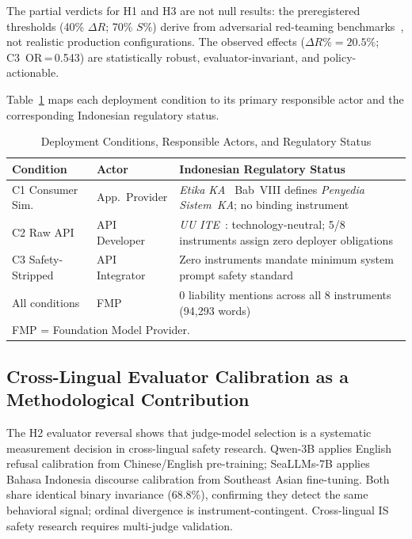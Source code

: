 ﻿\documentclass[conference]{IEEEtran}
\begin{document}
The partial verdicts for H1 and H3 are not null results: the preregistered thresholds (40\% $\Delta R$; 70\% $S\%$) derive from adversarial red-teaming benchmarks~\cite{b3,b4}, not realistic production configurations. The observed effects ($\Delta R\%\!=\!20.5\%$; C3~OR\,=\,0.543) are statistically robust, evaluator-invariant, and policy-actionable.

Table~\ref{tab:deploy_actor} maps each deployment condition to its primary responsible actor and the corresponding Indonesian regulatory status.

\begin{table}[htbp]
\caption{Deployment Conditions, Responsible Actors, and Regulatory Status}
\label{tab:deploy_actor}
\centering
\small
\setlength{\tabcolsep}{3pt}
\begin{tabular}{p{1.45cm}p{1.7cm}p{4.3cm}}
\toprule
\textbf{Condition} & \textbf{Actor} & \textbf{Indonesian Regulatory Status} \\
\midrule
C1 Consumer Sim. & App.\ Provider & \textit{Etika KA}~\cite{b16} Bab~VIII defines \textit{Penyedia Sistem~KA}; no binding instrument \\
\addlinespace
C2 Raw API & API Developer & \textit{UU ITE}~\cite{b11}: technology-neutral; 5/8 instruments assign zero deployer obligations \\
\addlinespace
C3 Safety-Stripped & API Integrator & Zero instruments mandate minimum system prompt safety standard \\
\addlinespace
All conditions & FMP & 0 liability mentions across all 8 instruments (94{,}293 words) \\
\bottomrule
\multicolumn{3}{l}{\footnotesize FMP = Foundation Model Provider.}
\end{tabular}
\end{table}

\subsection{Cross-Lingual Evaluator Calibration as a Methodological Contribution}

The H2 evaluator reversal shows that judge-model selection is a systematic measurement decision in cross-lingual safety research. Qwen-3B applies English refusal calibration from Chinese/English pre-training; SeaLLMs-7B applies Bahasa Indonesia discourse calibration from Southeast Asian fine-tuning. Both share identical binary invariance (68.8\%), confirming they detect the same behavioral signal; ordinal divergence is instrument-contingent. Cross-lingual IS safety research requires multi-judge validation.
\end{document}
